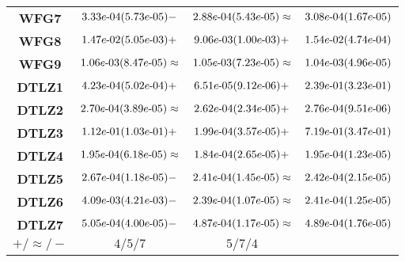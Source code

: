 \documentclass{article}
\begin{document}
\begin{table}[!htp]
\begin{tiny}
\begin{tabular}{c|ccc}
\textbf{WFG7} & ${3.33e\makebox[0.1cm]{-}04(5.73e\makebox[0.1cm]{-}05)-} $ & $ \cellcolor{gray95} {2.88e\makebox[0.1cm]{-}04(5.43e\makebox[0.1cm]{-}05)\approx} $ & $ \cellcolor{gray25} 3.08e\makebox[0.1cm]{-}04(1.67e\makebox[0.1cm]{-}05)$ \\
\textbf{WFG8} & $\cellcolor{gray25} {1.47e\makebox[0.1cm]{-}02(5.05e\makebox[0.1cm]{-}03)+} $ & $ \cellcolor{gray95} {9.06e\makebox[0.1cm]{-}03(1.00e\makebox[0.1cm]{-}03)+} $ & $ 1.54e\makebox[0.1cm]{-}02(4.74e\makebox[0.1cm]{-}04)$ \\
\textbf{WFG9} & ${1.06e\makebox[0.1cm]{-}03(8.47e\makebox[0.1cm]{-}05)\approx} $ & $ \cellcolor{gray25} {1.05e\makebox[0.1cm]{-}03(7.23e\makebox[0.1cm]{-}05)\approx} $ & $ \cellcolor{gray95} 1.04e\makebox[0.1cm]{-}03(4.96e\makebox[0.1cm]{-}05)$ \\
\textbf{DTLZ1} & $\cellcolor{gray25} {4.23e\makebox[0.1cm]{-}04(5.02e\makebox[0.1cm]{-}04)+} $ & $ \cellcolor{gray95} {6.51e\makebox[0.1cm]{-}05(9.12e\makebox[0.1cm]{-}06)+} $ & $ 2.39e\makebox[0.1cm]{-}01(3.23e\makebox[0.1cm]{-}01)$ \\
\textbf{DTLZ2} & $\cellcolor{gray25} {2.70e\makebox[0.1cm]{-}04(3.89e\makebox[0.1cm]{-}05)\approx} $ & $ \cellcolor{gray95} {2.62e\makebox[0.1cm]{-}04(2.34e\makebox[0.1cm]{-}05)+} $ & $ 2.76e\makebox[0.1cm]{-}04(9.51e\makebox[0.1cm]{-}06)$ \\
\textbf{DTLZ3} & $\cellcolor{gray25} {1.12e\makebox[0.1cm]{-}01(1.03e\makebox[0.1cm]{-}01)+} $ & $ \cellcolor{gray95} {1.99e\makebox[0.1cm]{-}04(3.57e\makebox[0.1cm]{-}05)+} $ & $ 7.19e\makebox[0.1cm]{-}01(3.47e\makebox[0.1cm]{-}01)$ \\
\textbf{DTLZ4} & ${1.95e\makebox[0.1cm]{-}04(6.18e\makebox[0.1cm]{-}05)\approx} $ & $ \cellcolor{gray95} {1.84e\makebox[0.1cm]{-}04(2.65e\makebox[0.1cm]{-}05)+} $ & $ \cellcolor{gray25} 1.95e\makebox[0.1cm]{-}04(1.23e\makebox[0.1cm]{-}05)$ \\
\textbf{DTLZ5} & ${2.67e\makebox[0.1cm]{-}04(1.18e\makebox[0.1cm]{-}05)-} $ & $ \cellcolor{gray95} {2.41e\makebox[0.1cm]{-}04(1.45e\makebox[0.1cm]{-}05)\approx} $ & $ \cellcolor{gray25} 2.42e\makebox[0.1cm]{-}04(2.15e\makebox[0.1cm]{-}05)$ \\
\textbf{DTLZ6} & ${4.09e\makebox[0.1cm]{-}03(4.21e\makebox[0.1cm]{-}03)-} $ & $ \cellcolor{gray95} {2.39e\makebox[0.1cm]{-}04(1.07e\makebox[0.1cm]{-}05)\approx} $ & $ \cellcolor{gray25} 2.41e\makebox[0.1cm]{-}04(1.25e\makebox[0.1cm]{-}05)$ \\
\textbf{DTLZ7} & ${5.05e\makebox[0.1cm]{-}04(4.00e\makebox[0.1cm]{-}05)-} $ & $ \cellcolor{gray95} {4.87e\makebox[0.1cm]{-}04(1.17e\makebox[0.1cm]{-}05)\approx} $ & $ \cellcolor{gray25} 4.89e\makebox[0.1cm]{-}04(1.76e\makebox[0.1cm]{-}05)$ \\
  \hline
\textbf{$+/\approx/-$} & $4/5/7 $ & $ 5/7/4$ \\
  \end{tabular}
  \end{tiny}
\end{table}
\end{document}

